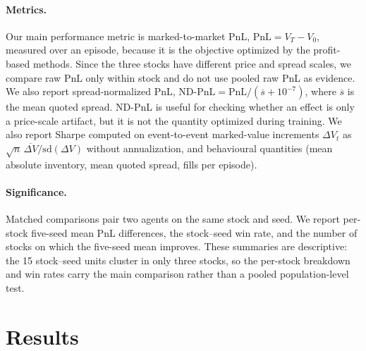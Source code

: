 \documentclass{article}
\begin{document}
\paragraph{Metrics.}
Our main performance metric is marked-to-market PnL, $\mathrm{PnL}=V_T-V_0$, measured over an episode, because it is the objective optimized by the profit-based methods. Since the three stocks have different price and spread scales, we compare raw PnL only within stock and do not use pooled raw PnL as evidence. We also report spread-normalized PnL, $\mathrm{ND\text{-}PnL}=\mathrm{PnL}/(\overline{s}+10^{-7})$, where $\overline{s}$ is the mean quoted spread. ND-PnL is useful for checking whether an effect is only a price-scale artifact, but it is not the quantity optimized during training. We also report Sharpe computed on event-to-event marked-value increments $\Delta V_t$ as $\sqrt{n}\,\overline{\Delta V}/\mathrm{sd}(\Delta V)$ without annualization, and behavioural quantities (mean absolute inventory, mean quoted spread, fills per episode).

\paragraph{Significance.}
Matched comparisons pair two agents on the same stock and seed. We report per-stock five-seed mean PnL differences, the stock--seed win rate, and the number of stocks on which the five-seed mean improves. These summaries are descriptive: the 15 stock--seed units cluster in only three stocks, so the per-stock breakdown and win rates carry the main comparison rather than a pooled population-level test.



\section{Results}
\label{sec:results}
\end{document}
